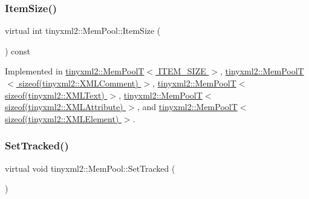 \mbox{\label{classtinyxml2_1_1_mem_pool_a0c518d49e3a94bde566f61e13b7240bb}} 
\subsubsection{\texorpdfstring{Item\+Size()}{ItemSize()}}
{\footnotesize\ttfamily virtual int tinyxml2\+::\+Mem\+Pool\+::\+Item\+Size (\begin{DoxyParamCaption}{ }\end{DoxyParamCaption}) const\hspace{0.3cm}{\ttfamily [pure virtual]}}



Implemented in \hyperlink{classtinyxml2_1_1_mem_pool_t_a54e4d9b343459ef1731314a99877ff35}{tinyxml2\+::\+Mem\+Pool\+T$<$ I\+T\+E\+M\+\_\+\+S\+I\+Z\+E $>$}, \hyperlink{classtinyxml2_1_1_mem_pool_t_a54e4d9b343459ef1731314a99877ff35}{tinyxml2\+::\+Mem\+Pool\+T$<$ sizeof(tinyxml2\+::\+X\+M\+L\+Comment) $>$}, \hyperlink{classtinyxml2_1_1_mem_pool_t_a54e4d9b343459ef1731314a99877ff35}{tinyxml2\+::\+Mem\+Pool\+T$<$ sizeof(tinyxml2\+::\+X\+M\+L\+Text) $>$}, \hyperlink{classtinyxml2_1_1_mem_pool_t_a54e4d9b343459ef1731314a99877ff35}{tinyxml2\+::\+Mem\+Pool\+T$<$ sizeof(tinyxml2\+::\+X\+M\+L\+Attribute) $>$}, and \hyperlink{classtinyxml2_1_1_mem_pool_t_a54e4d9b343459ef1731314a99877ff35}{tinyxml2\+::\+Mem\+Pool\+T$<$ sizeof(tinyxml2\+::\+X\+M\+L\+Element) $>$}.

\mbox{\label{classtinyxml2_1_1_mem_pool_ac5804dd1387b2e4de5eef710076a0db1}} 
\subsubsection{\texorpdfstring{Set\+Tracked()}{SetTracked()}}
{\footnotesize\ttfamily virtual void tinyxml2\+::\+Mem\+Pool\+::\+Set\+Tracked (\begin{DoxyParamCaption}{ }\end{DoxyParamCaption})\hspace{0.3cm}{\ttfamily [pure virtual]}}



